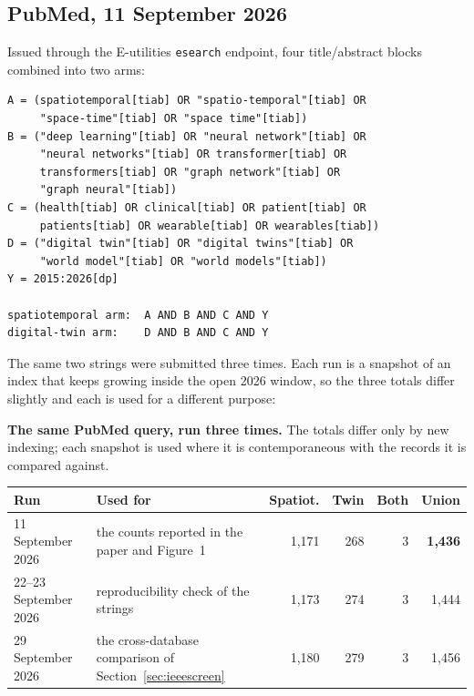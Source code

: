 \documentclass[journal]{IEEEtran}
\begin{document}
\subsection{PubMed, 11 September 2026}
Issued through the E-utilities \texttt{esearch} endpoint, four
title/abstract blocks combined into two arms:

{\scriptsize\begin{verbatim}
A = (spatiotemporal[tiab] OR "spatio-temporal"[tiab] OR
     "space-time"[tiab] OR "space time"[tiab])
B = ("deep learning"[tiab] OR "neural network"[tiab] OR
     "neural networks"[tiab] OR transformer[tiab] OR
     transformers[tiab] OR "graph network"[tiab] OR
     "graph neural"[tiab])
C = (health[tiab] OR clinical[tiab] OR patient[tiab] OR
     patients[tiab] OR wearable[tiab] OR wearables[tiab])
D = ("digital twin"[tiab] OR "digital twins"[tiab] OR
     "world model"[tiab] OR "world models"[tiab])
Y = 2015:2026[dp]

spatiotemporal arm:  A AND B AND C AND Y
digital-twin arm:    D AND B AND C AND Y
\end{verbatim}}

\noindent The same two strings were submitted three times. Each run is a snapshot
of an index that keeps growing inside the open 2026 window, so the three totals
differ slightly and each is used for a different purpose:

\begin{table}[tbp]
\centering
{\footnotesize\textbf{The same PubMed query, run three times.} The totals differ only by
new indexing; each snapshot is used where it is contemporaneous with the records it is
compared against.}
\smallskip
\footnotesize
\setlength{\tabcolsep}{4pt}
\begin{tabular}{llrrrr}
\toprule
\textbf{Run} & \textbf{Used for} & \textbf{Spatiot.} & \textbf{Twin} & \textbf{Both} & \textbf{Union} \\
\midrule
11 September 2026 & the counts reported in the paper and Figure~1 & 1{,}171 & 268 & 3 & \textbf{1{,}436} \\
\rowcolor{tablestripe}22--23 September 2026 & reproducibility check of the strings & 1{,}173 & 274 & 3 & 1{,}444 \\
29 September 2026 & the cross-database comparison of Section~\ref{sec:ieeescreen} & 1{,}180 & 279 & 3 & 1{,}456 \\
\bottomrule
\end{tabular}
\end{table}
\end{document}
